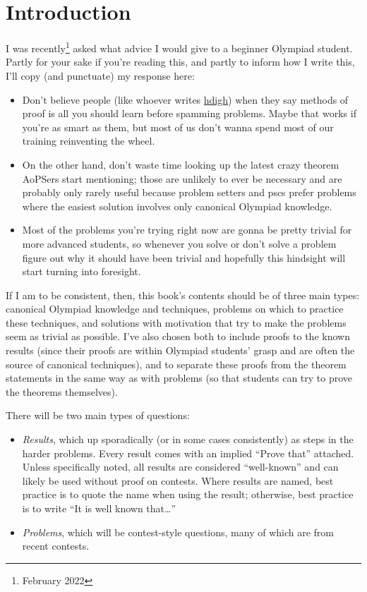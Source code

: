 \chapter*{Introduction}
I was recently\footnote{February 2022} asked what advice I would give to a
beginner Olympiad student. Partly for your sake if you're reading this, and
partly to inform how I write this, I'll copy (and punctuate) my response here:
\begin{itemize}
  \item Don't believe people (like whoever writes
    \href{https://web.archive.org/web/20220102030159/https://how-did-i-get-here.com/olympiad/}{hdigh}) when they say methods
    of proof is all you should learn before spamming problems. Maybe that works
    if you're as smart as them, but most of us don't wanna spend most of our
    training reinventing the wheel.
  \item On the other hand, don't waste time looking up the latest crazy theorem
    AoPSers start mentioning; those are unlikely to ever be necessary and are
    probably only rarely useful because problem setters and pscs prefer problems
    where the easiest solution involves only canonical Olympiad knowledge.
  \item Most of the problems you're trying right now are gonna be pretty
    trivial for more advanced students, so whenever you solve or
    don't solve a problem figure out why it should have been trivial and
    hopefully this hindsight will start turning into foresight.
\end{itemize}

If I am to be consistent, then, this book's contents should be of three main
types: canonical Olympiad knowledge and techniques, problems on which to
practice these techniques, and solutions with motivation that try to make the
problems seem as trivial as possible. I've also chosen both to include proofs to
the known results (since their proofs are within Olympiad students' grasp and
are often the source of canonical techniques), and to separate these proofs from
the theorem statements in the same way as with problems (so that
students can try to prove the theorems themselves). 

There will be two main types of questions:
\begin{itemize}
  \item \emph{Results}, which
    up sporadically (or in some cases consistently) as steps in the harder
    problems. Every result comes with an implied ``Prove that'' attached. Unless
    specifically noted, all results are considered ``well-known'' and can likely
    be used without proof on contests. Where results are named, best practice is
    to quote the name when using the result; otherwise, best practice is to
    write ``It is well known that\ldots''
  \item \emph{Problems}, which will be contest-style questions, many of which
      are from recent contests.
\end{itemize}

